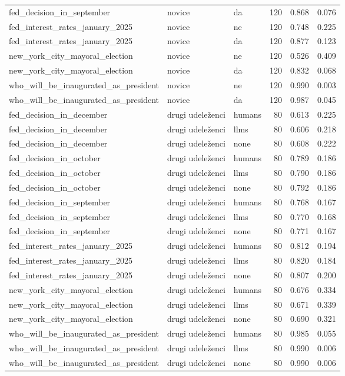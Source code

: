\begin{longtable}{lllrrr}
fed\_decision\_in\_september & novice & da & 120 & 0.868 & 0.076 \\
fed\_interest\_rates\_january\_2025 & novice & ne & 120 & 0.748 & 0.225 \\
fed\_interest\_rates\_january\_2025 & novice & da & 120 & 0.877 & 0.123 \\
new\_york\_city\_mayoral\_election & novice & ne & 120 & 0.526 & 0.409 \\
new\_york\_city\_mayoral\_election & novice & da & 120 & 0.832 & 0.068 \\
who\_will\_be\_inaugurated\_as\_president & novice & ne & 120 & 0.990 & 0.003 \\
who\_will\_be\_inaugurated\_as\_president & novice & da & 120 & 0.987 & 0.045 \\
fed\_decision\_in\_december & drugi udeleženci & humans & 80 & 0.613 & 0.225 \\
fed\_decision\_in\_december & drugi udeleženci & llms & 80 & 0.606 & 0.218 \\
fed\_decision\_in\_december & drugi udeleženci & none & 80 & 0.608 & 0.222 \\
fed\_decision\_in\_october & drugi udeleženci & humans & 80 & 0.789 & 0.186 \\
fed\_decision\_in\_october & drugi udeleženci & llms & 80 & 0.790 & 0.186 \\
fed\_decision\_in\_october & drugi udeleženci & none & 80 & 0.792 & 0.186 \\
fed\_decision\_in\_september & drugi udeleženci & humans & 80 & 0.768 & 0.167 \\
fed\_decision\_in\_september & drugi udeleženci & llms & 80 & 0.770 & 0.168 \\
fed\_decision\_in\_september & drugi udeleženci & none & 80 & 0.771 & 0.167 \\
fed\_interest\_rates\_january\_2025 & drugi udeleženci & humans & 80 & 0.812 & 0.194 \\
fed\_interest\_rates\_january\_2025 & drugi udeleženci & llms & 80 & 0.820 & 0.184 \\
fed\_interest\_rates\_january\_2025 & drugi udeleženci & none & 80 & 0.807 & 0.200 \\
new\_york\_city\_mayoral\_election & drugi udeleženci & humans & 80 & 0.676 & 0.334 \\
new\_york\_city\_mayoral\_election & drugi udeleženci & llms & 80 & 0.671 & 0.339 \\
new\_york\_city\_mayoral\_election & drugi udeleženci & none & 80 & 0.690 & 0.321 \\
who\_will\_be\_inaugurated\_as\_president & drugi udeleženci & humans & 80 & 0.985 & 0.055 \\
who\_will\_be\_inaugurated\_as\_president & drugi udeleženci & llms & 80 & 0.990 & 0.006 \\
who\_will\_be\_inaugurated\_as\_president & drugi udeleženci & none & 80 & 0.990 & 0.006 \\
\end{longtable}
\normalsize
